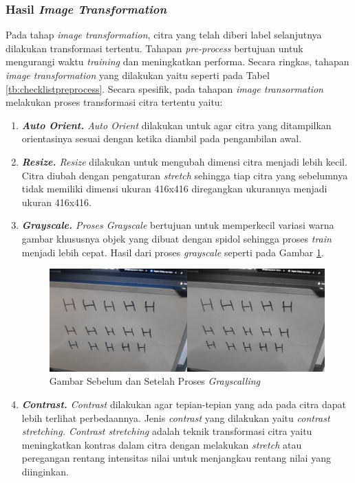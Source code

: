 \subsubsection{Hasil \textit{Image Transformation}}
\label{subsubsec:hasilpreprocess}

Pada tahap \textit{image transformation}, citra yang telah diberi label selanjutnya dilakukan transformasi tertentu. Tahapan \textit{pre-process} bertujuan untuk mengurangi waktu \textit{training} dan meningkatkan performa. Secara ringkas, tahapan \textit{image transformation} yang dilakukan yaitu seperti pada Tabel \ref*{tb:checklistpreprocess}. Secara spesifik, pada tahapan \textit{image transormation} melakukan proses transformasi citra tertentu yaitu:
\begin{enumerate}[nolistsep]
  \item \textit{\textbf{Auto Orient.} Auto Orient} dilakukan untuk agar citra yang ditampilkan orientasinya sesuai dengan ketika diambil pada pengambilan awal.
  \item \textit{\textbf{Resize.} Resize} dilakukan untuk mengubah dimensi citra menjadi lebih kecil. Citra diubah dengan pengaturan \textit{stretch} sehingga tiap citra yang sebelumnya tidak memiliki dimensi ukuran 416x416 diregangkan ukurannya menjadi ukuran 416x416.
  \item \textit{\textbf{Grayscale.} \textnormal{Proses} Grayscale} bertujuan untuk memperkecil variasi warna gambar khususnya objek yang dibuat dengan spidol sehingga proses \textit{train} menjadi lebih cepat. Hasil dari proses \textit{grayscale} seperti pada Gambar \ref{fig:grayscallingdataset}.
    \begin{figure}[H]
      \centering
      \includegraphics[scale=0.33]{gambar/grayscalling.png}
      \caption{Gambar Sebelum dan Setelah Proses \textit{Grayscalling}}
      \label{fig:grayscallingdataset}
    \end{figure}
  \item \textit{\textbf{Contrast.} Contrast} dilakukan agar tepian-tepian yang ada pada citra dapat lebih terlihat perbedaannya. Jenis \textit{contrast} yang dilakukan yaitu \textit{contrast stretching. Contrast stretching} adalah teknik transformasi citra yaitu meningkatkan kontras dalam citra dengan melakukan \textit{stretch} atau peregangan rentang intensitas nilai untuk menjangkau rentang nilai yang diinginkan.
\end{enumerate}

